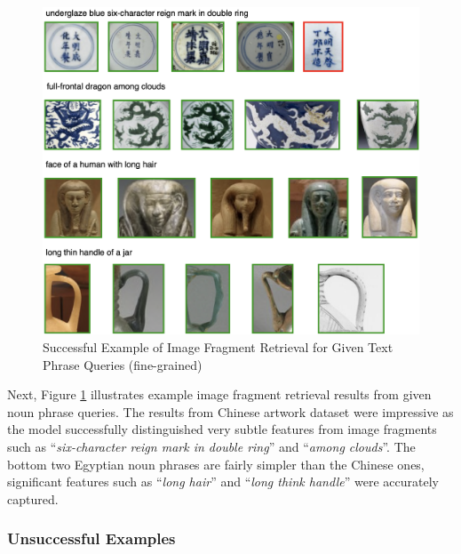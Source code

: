 \begin{figure}[h!]
\centering
\includegraphics[width=.9\textwidth]{t2i.png}
\caption{Successful Example of Image Fragment Retrieval for Given Text Phrase Queries (fine-grained)}
\label{fig:t2i}
\end{figure}

Next, Figure \ref{fig:t2i} illustrates example image fragment retrieval results from given noun phrase queries. The results from Chinese artwork dataset were impressive as the model successfully distinguished very subtle features from image fragments such as ``\textit{six-character reign mark in double ring}'' and ``\textit{among clouds}''. The bottom two Egyptian noun phrases are fairly simpler than the Chinese ones, significant features such as ``\textit{long hair}'' and ``\textit{long think handle}'' were accurately captured. 

\subsubsection{Unsuccessful Examples}


